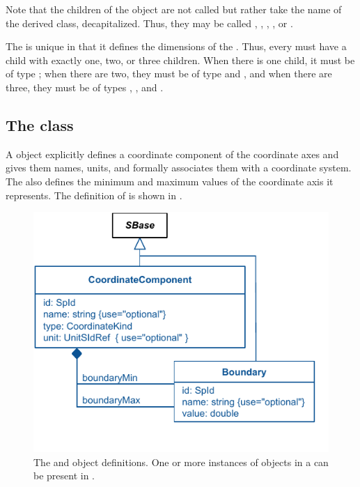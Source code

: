Note that the children of the \ListOfGeometryDefinitions object are not called  but rather take the name of the derived class, decapitalized.  Thus, they may be called , , , , or .

The \ListOfCoordinateComponents is unique in that it defines the dimensions of the \Geometry.  Thus, every \Geometry must have a child \ListOfCoordinateComponents with exactly one, two, or three children.  When there is one child, it must be of type ; when there are two, they must be of type  and , and when there are three, they must be of types , , and .


\subsection{The  class}
\label{coordinatecomponent-class}
A \CoordinateComponent object explicitly defines a coordinate component of the coordinate axes and gives them names, units, and formally associates them with a coordinate system. The \CoordinateComponent also defines the minimum and maximum values of the coordinate axis it represents. The definition of \CoordinateComponent is shown in .
 
\begin{figure}[ht]
  \includegraphics{figs/CoordinateComponent-uml}
  \caption{The \CoordinateComponent and \Boundary object definitions. One or more instances of \CoordinateComponent objects in a \ListOfCoordinateComponents can be present in \Geometry.}
  \label{CoordinateComponent-uml}
\end{figure}


